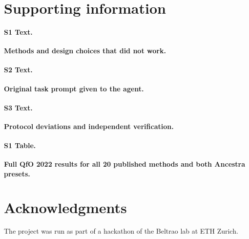 \section*{Supporting information}

\paragraph*{S1 Text.}
\label{S1_Text}
{\bf Methods and design choices that did not work.}

\paragraph*{S2 Text.}
\label{S2_Text}
{\bf Original task prompt given to the agent.}

\paragraph*{S3 Text.}
\label{S3_Text}
{\bf Protocol deviations and independent verification.}

\paragraph*{S1 Table.}
\label{S1_Table}
{\bf Full QfO 2022 results for all 20 published methods and both Ancestra presets.}

\section*{Acknowledgments}
The project was run as part of a hackathon of the Beltrao lab at ETH Zurich.

\nolinenumbers




